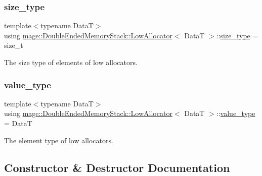 \subsubsection{\texorpdfstring{size\+\_\+type}{size\_type}}
{\footnotesize\ttfamily template$<$typename DataT$>$ \\
using \hyperlink{structmage_1_1_double_ended_memory_stack_1_1_low_allocator}{mage\+::\+Double\+Ended\+Memory\+Stack\+::\+Low\+Allocator}$<$ DataT $>$\+::\hyperlink{structmage_1_1_double_ended_memory_stack_1_1_low_allocator_ad59f0cf4da8f47289493179d9236e342}{size\+\_\+type} =  size\+\_\+t}

The size type of elements of low allocators. \hypertarget{structmage_1_1_double_ended_memory_stack_1_1_low_allocator_a76b57f9b67a84b4e09def8ce54451acb}{}\label{structmage_1_1_double_ended_memory_stack_1_1_low_allocator_a76b57f9b67a84b4e09def8ce54451acb} 
\subsubsection{\texorpdfstring{value\+\_\+type}{value\_type}}
{\footnotesize\ttfamily template$<$typename DataT$>$ \\
using \hyperlink{structmage_1_1_double_ended_memory_stack_1_1_low_allocator}{mage\+::\+Double\+Ended\+Memory\+Stack\+::\+Low\+Allocator}$<$ DataT $>$\+::\hyperlink{structmage_1_1_double_ended_memory_stack_1_1_low_allocator_a76b57f9b67a84b4e09def8ce54451acb}{value\+\_\+type} =  DataT}

The element type of low allocators. 

\subsection{Constructor \& Destructor Documentation}
\hypertarget{structmage_1_1_double_ended_memory_stack_1_1_low_allocator_a42774d0cb98d56b88d3e7b511b03e120}{}\label{structmage_1_1_double_ended_memory_stack_1_1_low_allocator_a42774d0cb98d56b88d3e7b511b03e120} 
